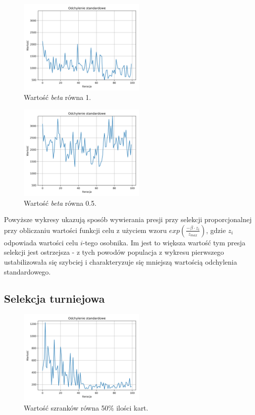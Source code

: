 \documentclass[12pt]{article}
\begin{document}
\begin{figure}[h]
	\centering					\includegraphics[width=0.55\textwidth]{roulette_3.png}
	\caption{Wartość \textit{beta} równa 1.}
	\label{fig1}
\end{figure}


\begin{figure}[h]
	\centering					\includegraphics[width=0.55\textwidth]{roulette_4.png}
	\caption{Wartość \textit{beta} równa 0.5.}
	\label{fig1}
\end{figure}

Powyższe wykresy ukazują sposób wywierania presji przy selekcji proporcjonalnej przy obliczaniu wartości funkcji celu z użyciem wzoru  $exp(\frac{- \beta \cdot z_i}{z_{max}})$, gdzie $z_i$ odpowiada wartości celu $i$-tego osobnika. Im jest to większa wartość tym presja selekcji jest ostrzejsza - z tych powodów populacja z wykresu pierwszego ustabilizowała się szybciej i charakteryzuje się mniejszą wartością odchylenia standardowego.


\newpage

\subsection{Selekcja turniejowa}

\begin{figure}[h]
	\centering					\includegraphics[width=0.55\textwidth]{tournament_1.png}
	\caption{Wartość szranków równa 50\% ilości kart.}
	\label{fig1}
\end{figure}
\end{document}
